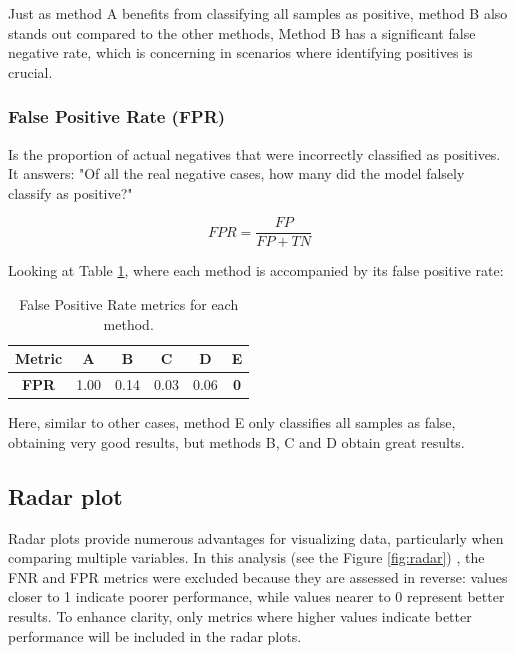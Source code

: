 \documentclass{llncs}
\begin{document}
Just as method A benefits from classifying all samples as positive, method B also stands out compared to the other methods, Method B has a significant false negative rate, which is concerning in scenarios where identifying positives is crucial.

\subsubsection{False Positive Rate (FPR)}
Is the proportion of actual negatives that were incorrectly classified as positives. It answers: "Of all the real negative cases, how many did the model falsely classify as positive?"

\[
FPR = \frac{FP}{FP + TN}
\]

Looking at Table \ref{tab:fpr}, where each method is accompanied by its false positive rate:
\begin{table}[h]
	\centering
	\begin{tabular}{|c|c|c|c|c|c|} 
		\hline 
		\textbf{Metric} & \textbf{A} & \textbf{B} & \textbf{C} & \textbf{D} & \textbf{E} \\ 
		\hline 
		\textbf{FPR} & 1.00 & 0.14 & 0.03 & 0.06 & \textbf{0} \\ 
		\hline 
	\end{tabular} 
	\caption{False Positive Rate metrics for each method.} 
	\label{tab:fpr} 
\end{table}
\vspace{-20pt}

Here, similar to other cases, method E only classifies all samples as false, obtaining very good results, but methods B, C and D obtain great results.

\subsection{Radar plot}

Radar plots provide numerous advantages for visualizing data, particularly when comparing multiple variables. In this analysis  (see the Figure \ref{fig:radar}) , the FNR and FPR metrics were excluded because they are assessed in reverse: values closer to 1 indicate poorer performance, while values nearer to 0 represent better results. To enhance clarity, only metrics where higher values indicate better performance will be included in the radar plots.
\end{document}
